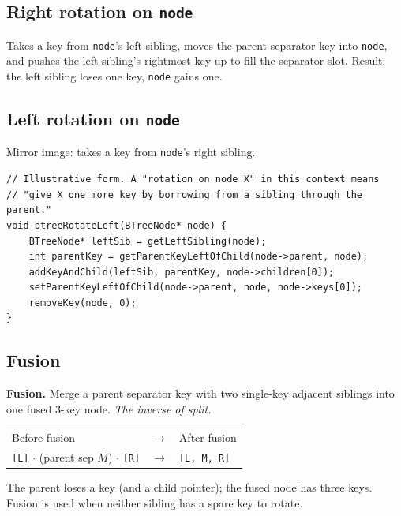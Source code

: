 \documentclass[11pt]{article}
\begin{document}
\subsection*{Right rotation on \texttt{node}}

Takes a key from \texttt{node}'s left sibling, moves the parent separator key into \texttt{node}, and pushes the left sibling's rightmost key up to fill the separator slot. Result: the left sibling loses one key, \texttt{node} gains one.

\subsection*{Left rotation on \texttt{node}}

Mirror image: takes a key from \texttt{node}'s right sibling.

\begin{lstlisting}[basicstyle=\ttfamily\small,frame=single]
// Illustrative form. A "rotation on node X" in this context means
// "give X one more key by borrowing from a sibling through the parent."
void btreeRotateLeft(BTreeNode* node) {
    BTreeNode* leftSib = getLeftSibling(node);
    int parentKey = getParentKeyLeftOfChild(node->parent, node);
    addKeyAndChild(leftSib, parentKey, node->children[0]);
    setParentKeyLeftOfChild(node->parent, node, node->keys[0]);
    removeKey(node, 0);
}
\end{lstlisting}

\subsection*{Fusion}

\begin{defnbox}
\textbf{Fusion.} Merge a parent separator key with two single-key adjacent siblings into one fused 3-key node. \emph{The inverse of split.}
\end{defnbox}

\begin{center}
\begin{tabular}{lll}
Before fusion & $\to$ & After fusion \\
\texttt{[L]} $\cdot$ (parent sep $M$) $\cdot$ \texttt{[R]} & $\to$ & \texttt{[L, M, R]} \\
\end{tabular}
\end{center}

The parent loses a key (and a child pointer); the fused node has three keys. Fusion is used when neither sibling has a spare key to rotate.
\end{document}

